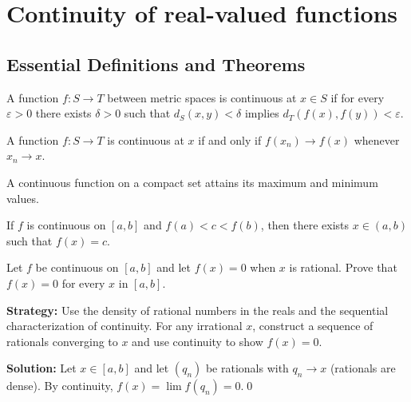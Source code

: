 \section{Continuity of real-valued functions}

\subsection*{Essential Definitions and Theorems}

\begin{definition}
A function $f: S \to T$ between metric spaces is continuous at $x \in S$ if for every $\varepsilon > 0$ there exists $\delta > 0$ such that $d_S(x,y) < \delta$ implies $d_T(f(x), f(y)) < \varepsilon$.
\end{definition}

\begin{theorem}
A function $f: S \to T$ is continuous at $x$ if and only if $f(x_n) \to f(x)$ whenever $x_n \to x$.
\end{theorem}

\begin{theorem}
A continuous function on a compact set attains its maximum and minimum values.
\end{theorem}

\begin{theorem}
If $f$ is continuous on $[a,b]$ and $f(a) < c < f(b)$, then there exists $x \in (a,b)$ such that $f(x) = c$.
\end{theorem}



\begin{problembox}
\begin{problemstatement}
Let \( f \) be continuous on \([a, b]\) and let \( f(x) = 0 \) when \( x \) is rational. Prove that \( f(x) = 0 \) for every \( x \) in \([a, b]\).
\end{problemstatement}
\end{problembox}

\noindent\textbf{Strategy:} Use the density of rational numbers in the reals and the sequential characterization of continuity. For any irrational $x$, construct a sequence of rationals converging to $x$ and use continuity to show $f(x) = 0$.

\bigskip\noindent\textbf{Solution:}
Let $x\in[a,b]$ and let $(q_n)$ be rationals with $q_n\to x$ (rationals are dense). By continuity, $f(x)=\lim f(q_n)=0$.\qed



